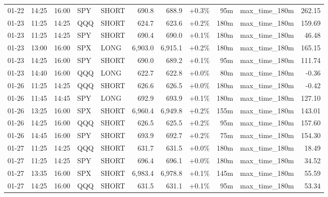 \documentclass[11pt,a4paper,twoside]{article}
\begin{document}
\begin{center}
\begin{longtable}{>{\color{txtmain}}l l l l l r r r r >{\color{txtmain}}l r}
01-22 & 14:25 & 16:00 & SPY & SHORT & 690.8 & 688.9 & \textcolor{wingreen}{+0.3\%} & 95m & max\_time\_180m & \textcolor{wingreen}{262.15} \\
01-23 & 11:25 & 14:25 & QQQ & SHORT & 624.7 & 623.6 & \textcolor{wingreen}{+0.2\%} & 180m & max\_time\_180m & \textcolor{wingreen}{159.69} \\
01-23 & 11:25 & 14:25 & SPY & SHORT & 690.4 & 690.0 & \textcolor{wingreen}{+0.1\%} & 180m & max\_time\_180m & \textcolor{wingreen}{46.48} \\
01-23 & 13:00 & 16:00 & SPX & LONG & 6,903.0 & 6,915.1 & \textcolor{wingreen}{+0.2\%} & 180m & max\_time\_180m & \textcolor{wingreen}{165.15} \\
01-23 & 14:25 & 16:00 & SPY & SHORT & 690.0 & 689.2 & \textcolor{wingreen}{+0.1\%} & 95m & max\_time\_180m & \textcolor{wingreen}{111.74} \\
01-23 & 14:40 & 16:00 & QQQ & LONG & 622.7 & 622.8 & \textcolor{wingreen}{+0.0\%} & 80m & max\_time\_180m & \textcolor{lossred}{-0.36} \\
01-26 & 11:25 & 14:25 & QQQ & SHORT & 626.6 & 626.5 & \textcolor{wingreen}{+0.0\%} & 180m & max\_time\_180m & \textcolor{lossred}{-0.42} \\
01-26 & 11:45 & 14:45 & SPY & LONG & 692.9 & 693.9 & \textcolor{wingreen}{+0.1\%} & 180m & max\_time\_180m & \textcolor{wingreen}{127.10} \\
01-26 & 13:25 & 16:00 & SPX & SHORT & 6,960.4 & 6,949.8 & \textcolor{wingreen}{+0.2\%} & 155m & max\_time\_180m & \textcolor{wingreen}{143.01} \\
01-26 & 14:25 & 16:00 & QQQ & SHORT & 626.5 & 625.5 & \textcolor{wingreen}{+0.2\%} & 95m & max\_time\_180m & \textcolor{wingreen}{157.60} \\
01-26 & 14:45 & 16:00 & SPY & SHORT & 693.9 & 692.7 & \textcolor{wingreen}{+0.2\%} & 75m & max\_time\_180m & \textcolor{wingreen}{154.30} \\
01-27 & 11:25 & 14:25 & QQQ & SHORT & 631.7 & 631.5 & \textcolor{wingreen}{+0.0\%} & 180m & max\_time\_180m & \textcolor{wingreen}{18.49} \\
01-27 & 11:25 & 14:25 & SPY & SHORT & 696.4 & 696.1 & \textcolor{wingreen}{+0.0\%} & 180m & max\_time\_180m & \textcolor{wingreen}{34.52} \\
01-27 & 13:35 & 16:00 & SPX & SHORT & 6,983.4 & 6,978.8 & \textcolor{wingreen}{+0.1\%} & 145m & max\_time\_180m & \textcolor{wingreen}{55.59} \\
01-27 & 14:25 & 16:00 & QQQ & SHORT & 631.5 & 631.1 & \textcolor{wingreen}{+0.1\%} & 95m & max\_time\_180m & \textcolor{wingreen}{53.34} \\

\end{longtable}
\end{center}
\end{document}
